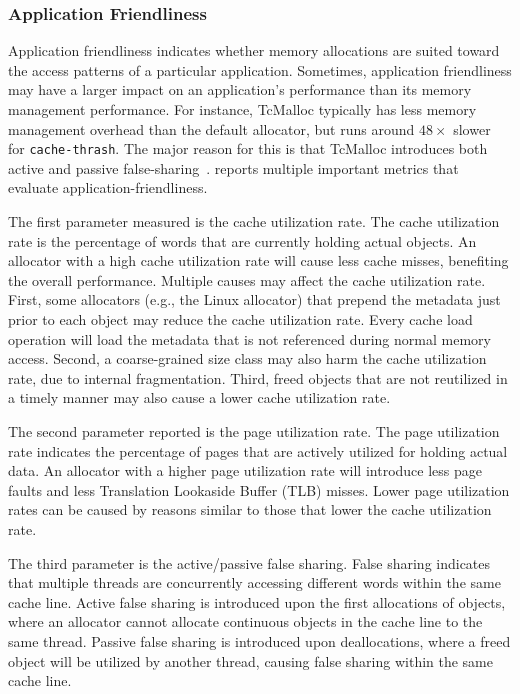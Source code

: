 \subsubsection{Application Friendliness}
\label{sec: friendliness}

Application friendliness indicates whether memory allocations are suited toward the access patterns of a particular application. Sometimes, application friendliness may have a larger impact on an application's performance than its memory management performance. For instance, TcMalloc typically has less memory management overhead than the default allocator, but runs around $48\times$ slower for \texttt{cache-thrash}. The major reason for this is that TcMalloc introduces both active and passive false-sharing~\cite{tcmallocsharing}. \MP{} reports multiple important metrics that evaluate application-friendliness.


The first parameter measured is the cache utilization rate. The cache utilization rate is the percentage of words that are currently holding actual objects. An allocator with a high cache utilization rate will cause less cache misses, benefiting the overall performance. Multiple causes may affect the cache utilization rate. First, some allocators (e.g., the Linux allocator) that prepend the metadata just prior to each object may reduce the cache utilization rate. Every cache load operation will load the metadata that is not referenced during normal memory access. 
 Second, a coarse-grained size class may also harm the cache utilization rate, due to internal fragmentation. Third, freed objects that are not reutilized in a timely manner may also cause a lower cache utilization rate. 


The second parameter reported is the page utilization rate. The page utilization rate indicates the percentage of pages that are actively utilized for holding actual data. An allocator with a higher page utilization rate will introduce less page faults and less Translation Lookaside Buffer (TLB) misses. Lower page utilization rates can be caused by reasons similar to those that lower the cache utilization rate.  

The third parameter is the active/passive false sharing. False sharing indicates that multiple threads are concurrently accessing different words within the same cache line. Active false sharing is introduced upon the first allocations of objects, where an allocator cannot allocate continuous objects in the cache line to the same thread. Passive false sharing is introduced upon deallocations, where a freed object will be utilized by another thread, causing false sharing within the same cache line. 

